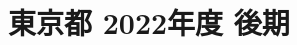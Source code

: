 \documentclass[../../hsm_tok_q.tex]{subfiles}
\begin{document}
    \section{東京都 2022年度 後期}
    \subsection{　}
    
    \newpage
    \subsection{　}
    
    \newpage
    \subsection{　}
    
    \newpage
    \subsection{　}
    
    \newpage
    \subsection{　}
    
\end{document}
